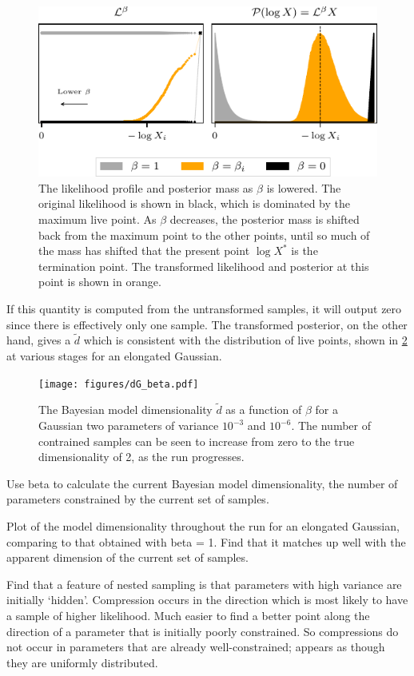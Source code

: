 \documentclass[usenatbib]{mnras}
\begin{document}
\begin{figure}
\begin{center}
	\includegraphics{figures/last_live_point.pdf}
\end{center}
\caption{The likelihood profile and posterior mass as $\beta$ is lowered. The original likelihood is shown in black, which is dominated by the maximum live point. As $\beta$ decreases, the posterior mass is shifted back from the maximum point to the other points, until so much of the mass has shifted that the present point $\log X^{*}$ is the termination point. The transformed likelihood and posterior at this point is shown in orange.}
\label{fig:last_live_point}
\end{figure}

If this quantity is computed from the untransformed samples, it will output zero since there is effectively only one sample. The transformed posterior, on the other hand, gives a $\tilde{d}$ which is consistent with the distribution of live points, shown in \cref{fig:dG_beta} at various stages for an elongated Gaussian. 
\begin{figure}
\begin{center}
	\texttt{[image: figures/dG\_beta.pdf]}
\end{center}
\caption{The Bayesian model dimensionality $\tilde{d}$ as a function of $\beta$ for a Gaussian two parameters of variance $10^{-3}$ and $10^{-6}$. The number of contrained samples can be seen to increase from zero to the true dimensionality of 2, as the run progresses.}
\label{fig:dG_beta}
\end{figure}

Use beta to calculate the current Bayesian model dimensionality, the number of parameters constrained by the current set of samples. 
\par
Plot of the model dimensionality throughout the run for an elongated Gaussian, comparing to that obtained with beta = 1. Find that it matches up well with the apparent dimension of the current set of samples. 
\par
Find that a feature of nested sampling is that parameters with high variance are initially `hidden'. Compression occurs in the direction which is most likely to have a sample of higher likelihood. Much easier to find a better point along the direction of a parameter that is initially poorly constrained. So compressions do not occur in parameters that are already well-constrained; appears as though they are uniformly distributed. 
\end{document}
